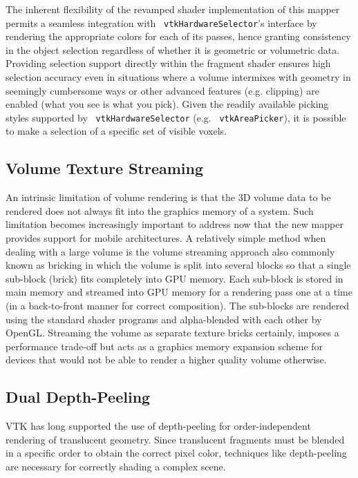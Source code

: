 The inherent flexibility of the revamped shader implementation of this mapper
permits a seamless integration with ~\texttt{vtkHardwareSelector}'s interface by
rendering the appropriate colors for each of its passes, hence granting
consistency in the object selection regardless of whether it is geometric or
volumetric data.  Providing selection support directly within the fragment
shader ensures high selection accuracy even in situations where a volume
intermixes with geometry in seemingly cumbersome ways or other advanced features
(e.g. clipping) are enabled (what you see is what you pick).  Given the readily
available picking styles supported by ~\texttt{vtkHardwareSelector} (e.g.
~\texttt{vtkAreaPicker}), it is possible to make a selection of a specific set
of visible voxels.

\subsection{Volume Texture Streaming} An intrinsic limitation of volume
rendering is that the 3D volume data to be rendered does not always fit into the
graphics memory of a system. Such limitation becomes increasingly important to
address now that the new mapper provides support for mobile architectures.  A
relatively simple method when dealing with a large volume is the volume
streaming approach also commonly known as bricking in which the volume is split
into several blocks so that a single sub-block (brick) fits completely into GPU
memory.  Each sub-block is stored in main memory and streamed into GPU memory
for a rendering pass one at a time (in a back-to-front manner for correct
composition). The sub-blocks are rendered using the standard shader programs and
alpha-blended with each other by OpenGL. Streaming the volume as separate
texture bricks certainly, imposes a performance trade-off but acts as a graphics
memory expansion scheme for devices that would not be able to render a higher
quality volume otherwise.

\subsection{Dual Depth-Peeling}

VTK has long supported the use of depth-peeling for order-independent rendering
of translucent geometry. Since translucent fragments must be blended in a
specific order to obtain the correct pixel color, techniques like depth-peeling
are necessary for correctly shading a complex scene.

